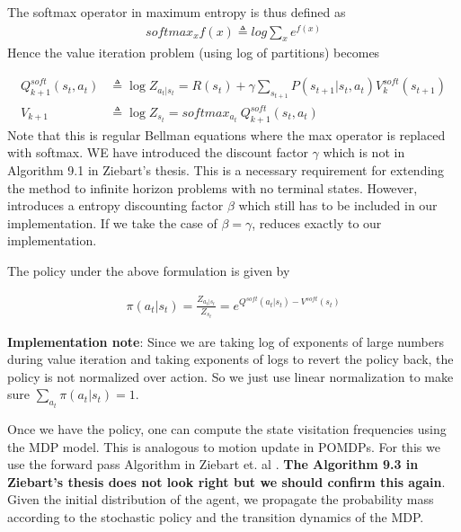 \documentclass{article}[11pt]
\begin{document}
The softmax operator in maximum entropy is thus defined as
\begin{align*}
softmax_x f(x) \triangleq log \sum_x e^{f(x)}
\end{align*}
Hence the value iteration problem (using log of partitions) becomes

\begin{align}
  Q^{soft}_{k+1}(s_t,a_t) &\triangleq \log Z_{a_t|s_t} = R(s_t) + \gamma\sum_{s_{t+1}} P(s_{t+1}|s_t,a_t)V^{soft}_k(s_{t+1})\\
  V_{k+1} &\triangleq \log Z_{s_t} = softmax_{a_t} \ Q^{soft}_{k+1}(s_t,a_t)
\end{align} 
Note that this is regular Bellman equations where the max operator is replaced with softmax. WE have introduced the discount factor $\gamma$ which is not in Algorithm 9.1 in Ziebart's thesis. This is a necessary requirement for extending the method to infinite horizon problems with no terminal states\cite{bloem2014infinite}. However, \cite{bloem2014infinite} introduces a entropy discounting factor $\beta$ which still has to be included in our implementation. If we take the case of $\beta = \gamma$, \cite{bloem2014infinite} reduces exactly to our implementation. 

The policy under the above formulation is given by 

\begin{align}
\pi(a_t|s_t) =  \frac{Z_{a_t|s_t}}{Z_{s_t}} = e^{Q^{soft}(a_t|s_t) - V^{soft}(s_t)}
\end{align}

\textbf{Implementation note}: Since we are taking log of exponents of large numbers during value iteration and taking exponents of logs to revert the policy back, the policy is not normalized over action. So we just use linear normalization to make sure $\sum_{a_t} \pi(a_t|s_t) = 1$. 

Once we have the policy, one can compute the state visitation frequencies using the MDP model. This is analogous to motion update in POMDPs. For this we use the forward pass Algorithm in Ziebart et. al \cite{ziebart2008maximum}. \textbf{The Algorithm 9.3 in Ziebart's thesis \cite{ziebart2010modeling} does not look right but we should confirm this again}. Given the initial distribution of the agent, we propagate the probability mass according to the stochastic policy and the transition dynamics of the MDP. 
\end{document}
